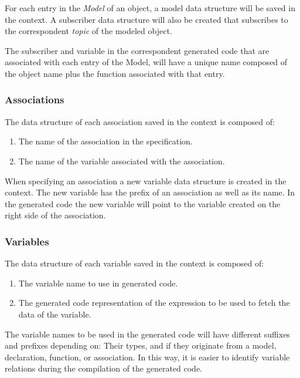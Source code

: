 For each entry in the \textit{Model} of an object, a model data structure will be saved in the context. A subscriber data structure will also be created that subscribes to the correspondent \textit{topic} of the modeled object.

The subscriber and variable in the correspondent generated code that are associated with each entry of the Model, will have a unique name composed of the object name plus the function associated with that entry.


\subsubsection{Associations}
\label{sssec:compileAssoc}

The data structure of each association saved in the context is composed of:

\begin{enumerate}
    \item The name of the association in the specification.
    \item The name of the variable associated with the association.
\end{enumerate}

When specifying an association a new variable data structure is created in the context. The new variable has the prefix of an association as well as its name. In the generated code the new variable will point to the variable created on the right side of the association.


\subsubsection{Variables}
\label{sssec:compileVars}

The data structure of each variable saved in the context is composed of:

\begin{enumerate}
    \item The variable name to use in generated code.
    \item The generated code representation of the expression to be used to fetch the data of the variable.
\end{enumerate}

The variable names to be used in the generated code will have different suffixes and prefixes depending on: Their types, and if they originate from a model, declaration, function, or association. In this way, it is easier to identify variable relations during the compilation of the generated code.

